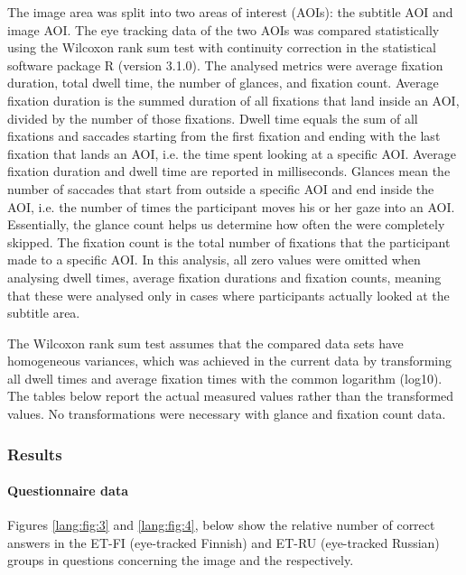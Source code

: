 \documentclass[output=paper]{langsci/langscibook}
\begin{document}
The image area was split into two areas of interest (AOIs): the subtitle AOI and image AOI. The eye tracking data of the two AOIs was compared statistically using the Wilcoxon rank sum test with continuity correction in the statistical software package R (version 3.1.0). The analysed metrics were average fixation duration, total dwell time, the number of glances, and fixation count. Average fixation duration is the summed duration of all fixations that land inside an AOI, divided by the number of those fixations. Dwell time equals the sum of all fixations and saccades starting from the first fixation and ending with the last fixation that lands an AOI, i.e. the time spent looking at a specific AOI. Average fixation duration and dwell time are reported in milliseconds. Glances mean the number of saccades that start from outside a specific AOI and end inside the AOI, i.e. the number of times the participant moves his or her gaze into an AOI. Essentially, the glance count helps us determine how often the  were completely skipped. The fixation count is the total number of fixations that the participant made to a specific AOI. In this analysis, all zero values were omitted when analysing dwell times, average fixation durations and fixation counts, meaning that these were analysed only in cases where participants actually looked at the subtitle area.

The Wilcoxon rank sum test assumes that the compared data sets have homogeneous variances, which was achieved in the current data by transforming all dwell times and average fixation times with the common logarithm (log10). The tables below report the actual measured values rather than the transformed values. No transformations were necessary with glance and fixation count data.

\subsubsection{Results}

\paragraph{Questionnaire data}


Figures \ref{lang:fig:3} and \ref{lang:fig:4}, below show the relative number of correct answers in the ET-FI (eye-tracked Finnish) and ET-RU (eye-tracked Russian) groups in questions concerning the image and the  respectively.
\end{document}
